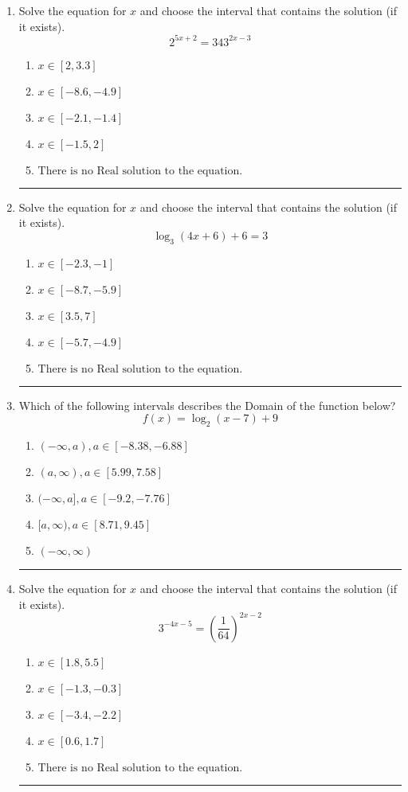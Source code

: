 \documentclass[14pt]{extbook}
\newcommand{\litem}[1]{\item#1\hspace*{-1cm}\rule{\textwidth}{0.4pt}}
\begin{document}
\begin{enumerate}
\litem{
Solve the equation for $x$ and choose the interval that contains the solution (if it exists).\[ 2^{5x+2} = 343^{2x-3} \]\begin{enumerate}[label=\Alph*.]
\item \( x \in [2, 3.3] \)
\item \( x \in [-8.6, -4.9] \)
\item \( x \in [-2.1, -1.4] \)
\item \( x \in [-1.5, 2] \)
\item \( \text{There is no Real solution to the equation.} \)

\end{enumerate} }
\litem{
Solve the equation for $x$ and choose the interval that contains the solution (if it exists).\[ \log_{3}{(4x+6)}+6 = 3 \]\begin{enumerate}[label=\Alph*.]
\item \( x \in [-2.3, -1] \)
\item \( x \in [-8.7, -5.9] \)
\item \( x \in [3.5, 7] \)
\item \( x \in [-5.7, -4.9] \)
\item \( \text{There is no Real solution to the equation.} \)

\end{enumerate} }
\litem{
Which of the following intervals describes the Domain of the function below?\[ f(x) = \log_2{(x-7)}+9 \]\begin{enumerate}[label=\Alph*.]
\item \( (-\infty, a), a \in [-8.38, -6.88] \)
\item \( (a, \infty), a \in [5.99, 7.58] \)
\item \( (-\infty, a], a \in [-9.2, -7.76] \)
\item \( [a, \infty), a \in [8.71, 9.45] \)
\item \( (-\infty, \infty) \)

\end{enumerate} }
\litem{
Solve the equation for $x$ and choose the interval that contains the solution (if it exists).\[ 3^{-4x-5} = \left(\frac{1}{64}\right)^{2x-2} \]\begin{enumerate}[label=\Alph*.]
\item \( x \in [1.8, 5.5] \)
\item \( x \in [-1.3, -0.3] \)
\item \( x \in [-3.4, -2.2] \)
\item \( x \in [0.6, 1.7] \)
\item \( \text{There is no Real solution to the equation.} \)


\end{enumerate}}
\end{enumerate}
\end{document}
